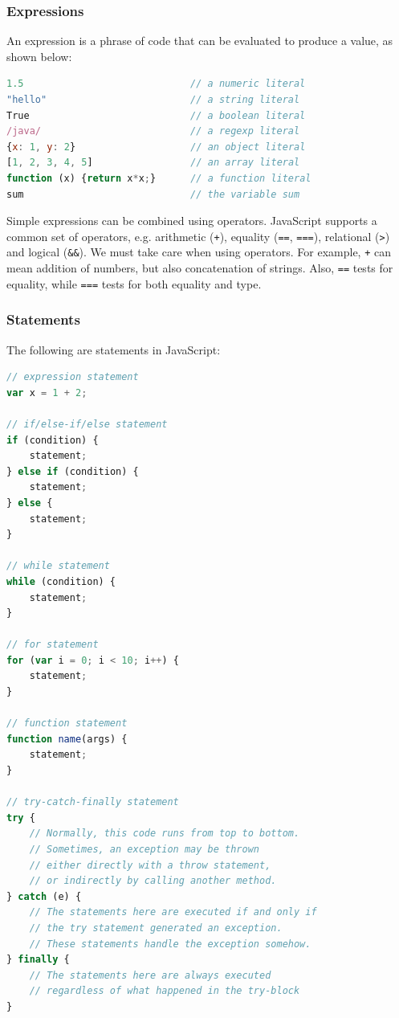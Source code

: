 \documentclass[a4paper, openany]{memoir}
\begin{document}
\subsubsection{Expressions}
An expression is a phrase of code that can be evaluated to produce a value, as shown below:
\begin{lstlisting}[language=javascript]
1.5                             // a numeric literal
"hello"                         // a string literal
True                            // a boolean literal 
/java/                          // a regexp literal
{x: 1, y: 2}                    // an object literal
[1, 2, 3, 4, 5]                 // an array literal
function (x) {return x*x;}      // a function literal
sum                             // the variable sum
\end{lstlisting}
Simple expressions can be combined using operators. JavaScript supports a common set of operators, e.g. arithmetic (\texttt{+}), equality (\texttt{==}, \texttt{===}), relational (\texttt{>}) and logical (\texttt{\&\&}). We must take care when using operators. For example, \texttt{+} can mean addition of numbers, but also concatenation of strings. Also, \texttt{==} tests for equality, while \texttt{===} tests for both equality and type.

\subsubsection{Statements}
The following are statements in JavaScript:
\begin{lstlisting}[language=javascript]
// expression statement
var x = 1 + 2;

// if/else-if/else statement
if (condition) {
    statement;
} else if (condition) {
    statement;
} else {
    statement;
}

// while statement
while (condition) {
    statement;
}

// for statement
for (var i = 0; i < 10; i++) {
    statement;
}

// function statement
function name(args) {
    statement;
}

// try-catch-finally statement
try {
    // Normally, this code runs from top to bottom.
    // Sometimes, an exception may be thrown
    // either directly with a throw statement,
    // or indirectly by calling another method.
} catch (e) {
    // The statements here are executed if and only if
    // the try statement generated an exception.
    // These statements handle the exception somehow.
} finally {
    // The statements here are always executed
    // regardless of what happened in the try-block
}
\end{lstlisting}
\end{document}
